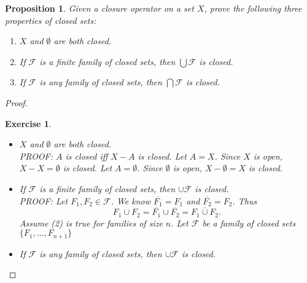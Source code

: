 \documentclass[12pt]{amsart}
\newtheorem{proposition}[theorem]{Proposition}
\newtheorem{exercise}{Exercise}[section]
\theoremstyle{definition}
\theoremstyle{remark}
\newcommand{\0}{\emptyset}
\newcommand{\F}{\mathcal F}
\begin{document}
\begin{proposition}
Given a closure operator on a set $X$, prove the following three properties of closed sets:
\begin{enumerate}
\item $X$ and $\0$ are both closed.
\item If $\F$ is a finite family of closed sets, then $\bigcup \F$ is closed.
\item If $\F$ is any family of closed sets, then $\bigcap \F$ is closed.
\end{enumerate}
\end{proposition}
\begin{proof}
\begin{exercise}
\begin{itemize}
\rm\
\item[(a)] $X$ and $\emptyset$ are both closed.
\\PROOF: $A$ is closed iff $X-A$ is closed.  Let $A=X$.  Since $X$ is open, $X-X=\emptyset$ is closed.  Let $A=\emptyset$.  Since $\emptyset$ is open, $X-\emptyset=X$ is closed.

\item[(b)] If $\mathscr{F}$ is a finite family of closed sets, then $\cup\mathscr{F}$ is closed.
\\PROOF: Let $F_1, F_2 \in \mathscr{F}$.  We know $\overline{F_1}=F_1$ and $\overline{F_2}=F_2$.  Thus \[F_1 \cup F_2=\overline{F_1}\cup\overline{F_2}=\overline{F_1 \cup F_2}.\] Assume (2) is true for families of size $n$.  Let $\mathscr{F}$ be a family of closed sets $\{F_1, \dots, F_{n+1}\}$ \item[(c)] If $\mathscr{F}$ is any family of closed sets, then $\cup \mathscr{F}$ is closed.
	\end{itemize}
\end{exercise}
\end{proof}
\end{document}
